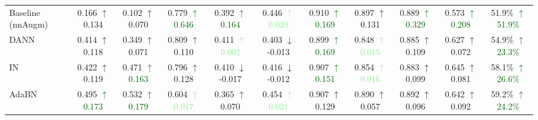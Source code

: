 \begin{table*}[ht]
{\begin{tabular}{lcccccccccc}
        Baseline (nnAugm) & 0.166 \textcolor{medGreen}{$\uparrow$0.134} & 0.102 \textcolor{medGreen}{$\uparrow$0.070} & 0.779 \textcolor{darkGreen}{$\uparrow$0.646} & 0.392 \textcolor{darkGreen}{$\uparrow$0.164} & 0.446 \textcolor{lightGreen}{$\uparrow$0.020} & 0.910 \textcolor{darkGreen}{$\uparrow$0.169} & 0.897 \textcolor{medGreen}{$\uparrow$0.131} & 0.889 \textcolor{darkGreen}{$\uparrow$0.329} & 0.573 \textcolor{darkGreen}{$\uparrow$0.208} & 51.9\% \textcolor{darkGreen}{$\uparrow$51.9\%} \\  %
        DANN        & 0.414 \textcolor{medGreen}{$\uparrow$0.118} & 0.349 \textcolor{medGreen}{$\uparrow$0.071} & 0.809 \textcolor{medGreen}{$\uparrow$0.110} & 0.411 \textcolor{lightGreen}{$\uparrow$0.002} & 0.403 \textcolor{lightRed}{$\downarrow$-0.013} & 0.899 \textcolor{darkGreen}{$\uparrow$0.169} & 0.848 \textcolor{lightGreen}{$\uparrow$0.015} & 0.885 \textcolor{medGreen}{$\uparrow$0.109} & 0.627 \textcolor{medGreen}{$\uparrow$0.072} & 54.9\% \textcolor{darkGreen}{$\uparrow$23.3\%} \\

        IN          & 0.422 \textcolor{medGreen}{$\uparrow$0.119} & 0.471 \textcolor{darkGreen}{$\uparrow$0.163} & 0.796 \textcolor{medGreen}{$\uparrow$0.128} & 0.410 \textcolor{lightRed}{$\downarrow$-0.017} & 0.416 \textcolor{lightRed}{$\downarrow$-0.012} & 0.907 \textcolor{darkGreen}{$\uparrow$0.151} & 0.854 \textcolor{lightGreen}{$\uparrow$0.016} & 0.883 \textcolor{medGreen}{$\uparrow$0.099} & 0.645 \textcolor{medGreen}{$\uparrow$0.081} & 58.1\% \textcolor{darkGreen}{$\uparrow$26.6\%} \\
        AdaBN       & 0.495 \textcolor{darkGreen}{$\uparrow$0.173} & 0.532 \textcolor{darkGreen}{$\uparrow$0.179} & 0.604 \textcolor{lightGreen}{$\uparrow$0.017} & 0.365 \textcolor{medGreen}{$\uparrow$0.070} & 0.454 \textcolor{lightGreen}{$\uparrow$0.021} & 0.907 \textcolor{medGreen}{$\uparrow$0.129} & 0.890 \textcolor{medGreen}{$\uparrow$0.057} & 0.892 \textcolor{medGreen}{$\uparrow$0.096} & 0.642 \textcolor{medGreen}{$\uparrow$0.092} & 59.2\% \textcolor{darkGreen}{$\uparrow$24.2\%} \\


\end{tabular}}
\end{table*}

